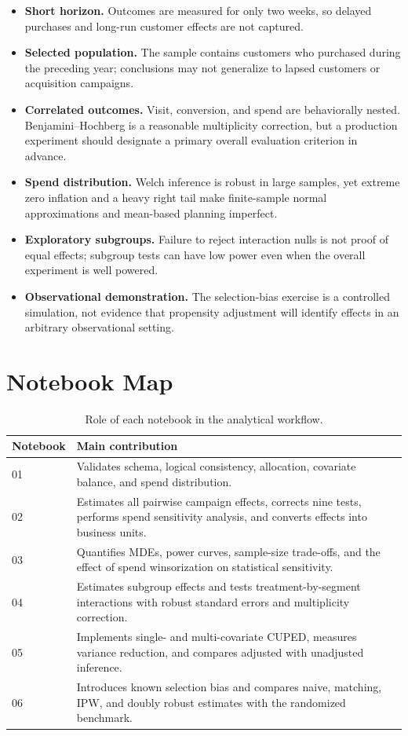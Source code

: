 \documentclass[11pt]{article}
\begin{document}
\begin{itemize}
    \item \textbf{Short horizon.} Outcomes are measured for only two weeks, so delayed purchases and long-run customer effects are not captured.
    \item \textbf{Selected population.} The sample contains customers who purchased during the preceding year; conclusions may not generalize to lapsed customers or acquisition campaigns.
    \item \textbf{Correlated outcomes.} Visit, conversion, and spend are behaviorally nested. Benjamini--Hochberg is a reasonable multiplicity correction, but a production experiment should designate a primary overall evaluation criterion in advance.
    \item \textbf{Spend distribution.} Welch inference is robust in large samples, yet extreme zero inflation and a heavy right tail make finite-sample normal approximations and mean-based planning imperfect.
    \item \textbf{Exploratory subgroups.} Failure to reject interaction nulls is not proof of equal effects; subgroup tests can have low power even when the overall experiment is well powered.
    \item \textbf{Observational demonstration.} The selection-bias exercise is a controlled simulation, not evidence that propensity adjustment will identify effects in an arbitrary observational setting.
\end{itemize}

\appendix
\section{Notebook Map}

\begin{table}[H]
\centering
\caption{Role of each notebook in the analytical workflow.}
\begin{tabularx}{\textwidth}{@{}l>{\raggedright\arraybackslash}X@{}}
\toprule
Notebook & Main contribution \\
\midrule
01 & Validates schema, logical consistency, allocation, covariate balance, and spend distribution. \\
02 & Estimates all pairwise campaign effects, corrects nine tests, performs spend sensitivity analysis, and converts effects into business units. \\
03 & Quantifies MDEs, power curves, sample-size trade-offs, and the effect of spend winsorization on statistical sensitivity. \\
04 & Estimates subgroup effects and tests treatment-by-segment interactions with robust standard errors and multiplicity correction. \\
05 & Implements single- and multi-covariate CUPED, measures variance reduction, and compares adjusted with unadjusted inference. \\
06 & Introduces known selection bias and compares naive, matching, IPW, and doubly robust estimates with the randomized benchmark. \\
\bottomrule
\end{tabularx}
\end{table}
\end{document}
